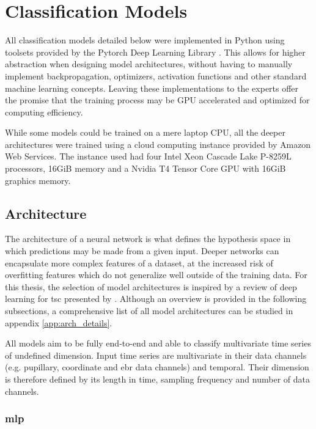 \section{Classification Models} \label{sec:impl/clf_models}

All classification models detailed below were implemented in Python using toolsets provided by the Pytorch Deep Learning Library \cite{paszke2019}. This allows for higher abstraction when designing model architectures, without having to manually implement backpropagation, optimizers, activation functions and other standard machine learning concepts. Leaving these implementations to the experts offer the promise that the training process may be GPU accelerated and optimized for computing efficiency.

While some models could be trained on a mere laptop CPU, all the deeper architectures were trained using a cloud computing instance provided by Amazon Web Services. The instance used had four Intel Xeon Cascade Lake P-8259L processors, 16GiB memory and a  Nvidia T4 Tensor Core GPU with 16GiB graphics memory.

\subsection{Architecture}

The architecture of a neural network is what defines the hypothesis space in which predictions may be made from a given input. Deeper networks can encapsulate more complex features of a dataset, at the increased risk of overfitting features which do not generalize well outside of the training data. For this thesis, the selection of model architectures is inspired by a review of deep learning for \acrshort{tsc} presented by \textcite{fawaz2018}. Although an overview is provided in the following subsections, a comprehensive list of all model architectures can be studied in appendix \ref{app:arch_details}.

All models aim to be fully end-to-end and able to classify multivariate time series of undefined dimension. Input time series are multivariate in their data channels (e.g. pupillary, coordinate and \acrshort{ebr} data channels) and temporal. Their dimension is therefore defined by its length in time, sampling frequency and number of data channels. 

\newpage
\subsubsection{\acrlong{mlp}}


